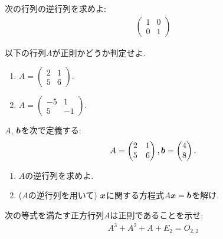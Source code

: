 \begin{quiz}
  次の行列の逆行列を求めよ:
  \begin{align*}
    \begin{pmatrix}
      1&0\\0&1
    \end{pmatrix}
  \end{align*}
\end{quiz}

\begin{quiz}
  \label{quiz:2:reg:1}
  以下の行列$A$が正則かどうか判定せよ.
  \begin{enumerate}
  \item
    $A=\begin{pmatrix}2&1\\5&6\end{pmatrix}$.
  \item
    $A=\begin{pmatrix}-5&1\\5&-1\end{pmatrix}$.
  \end{enumerate}
\end{quiz}

\begin{quiz}
  \label{quiz:2:4}
  $A$, $\boldsymbol{b}$を次で定義する:
  \begin{align*}
    A=\begin{pmatrix}
      2&1\\5&6
    \end{pmatrix},
    \boldsymbol{b}=\begin{pmatrix}
      4\\8
    \end{pmatrix}.   
  \end{align*}
  \begin{enumerate}
  \item $A$の逆行列を求めよ.
  \item ($A$の逆行列を用いて) $\boldsymbol{x}$に関する方程式$A\boldsymbol{x}=\boldsymbol{b}$を解け.
  \end{enumerate}
\end{quiz}

\begin{quiz}
  次の等式を満たす正方行列$A$は正則であることを示せ:
  \begin{align*}
    A^3+A^2+A+E_2=O_{2,2}
  \end{align*}
\end{quiz}



